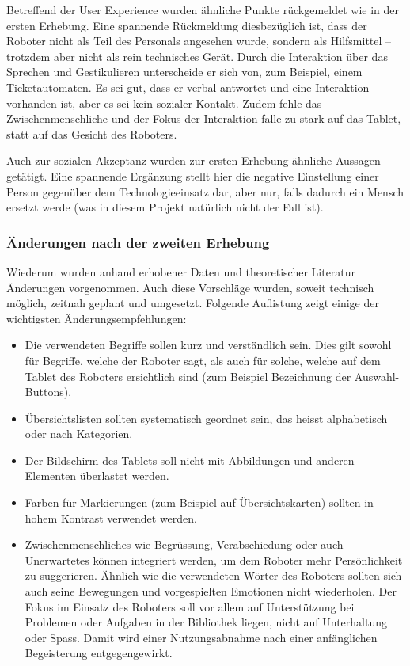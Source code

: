 \documentclass[a4paper,
fontsize=11pt,
oneside,
numbers=noperiodatend,
parskip=half-,
bibliography=totoc,
final
]{scrartcl}
\begin{document}
Betreffend der User Experience wurden ähnliche Punkte rückgemeldet wie
in der ersten Erhebung. Eine spannende Rückmeldung diesbezüglich ist,
dass der Roboter nicht als Teil des Personals angesehen wurde, sondern
als Hilfsmittel -- trotzdem aber nicht als rein technisches Gerät. Durch
die Interaktion über das Sprechen und Gestikulieren unterscheide er sich
von, zum Beispiel, einem Ticketautomaten. Es sei gut, dass er verbal
antwortet und eine Interaktion vorhanden ist, aber es sei kein sozialer
Kontakt. Zudem fehle das Zwischenmenschliche und der Fokus der
Interaktion falle zu stark auf das Tablet, statt auf das Gesicht des
Roboters.

Auch zur sozialen Akzeptanz wurden zur ersten Erhebung ähnliche Aussagen
getätigt. Eine spannende Ergänzung stellt hier die negative Einstellung
einer Person gegenüber dem Technologieeinsatz dar, aber nur, falls
dadurch ein Mensch ersetzt werde (was in diesem Projekt natürlich nicht
der Fall ist).

\hypertarget{uxe4nderungen-nach-der-zweiten-erhebung}{%
\subsubsection{Änderungen nach der zweiten Erhebung}\label{uxe4nderungen-nach-der-zweiten-erhebung}}

Wiederum wurden anhand erhobener Daten und theoretischer Literatur
Änderungen vorgenommen. Auch diese Vorschläge wurden, soweit technisch
möglich, zeitnah geplant und umgesetzt. Folgende Auflistung zeigt einige
der wichtigsten Änderungsempfehlungen:

\begin{itemize}
\item
  Die verwendeten Begriffe sollen kurz und verständlich sein. Dies gilt
  sowohl für Begriffe, welche der Roboter sagt, als auch für solche,
  welche auf dem Tablet des Roboters ersichtlich sind (zum Beispiel
  Bezeichnung der Auswahl-Buttons).
\item
  Übersichtslisten sollten systematisch geordnet sein, das heisst
  alphabetisch oder nach Kategorien.
\item
  Der Bildschirm des Tablets soll nicht mit Abbildungen und anderen
  Elementen überlastet werden.
\item
  Farben für Markierungen (zum Beispiel auf Übersichtskarten) sollten in
  hohem Kontrast verwendet werden.
\item
  Zwischenmenschliches wie Begrüssung, Verabschiedung oder auch
  Unerwartetes können integriert werden, um dem Roboter mehr
  Persönlichkeit zu suggerieren. Ähnlich wie die verwendeten Wörter des
  Roboters sollten sich auch seine Bewegungen und vorgespielten
  Emotionen nicht wiederholen. Der Fokus im Einsatz des Roboters soll
  vor allem auf Unterstützung bei Problemen oder Aufgaben in der
  Bibliothek liegen, nicht auf Unterhaltung oder Spass. Damit wird einer
  Nutzungsabnahme nach einer anfänglichen Begeisterung entgegengewirkt.
\end{itemize}
\end{document}

